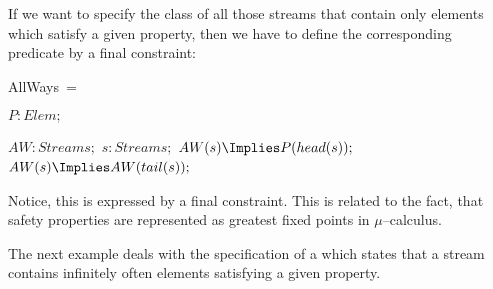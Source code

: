 \documentclass[landscape, autoslides, light]{mmiss}
\newcommand{\ns}{\normalsize}
\begin{document}
\begin{Package}[Label={FSDPT}, Title={Formal Specification of Data and Process Types}, ShortTitle={FSDPT}, Authors={Horst Reichel}, Date={February 2003}, LevelOfDetail=Lecture, Language=en-GB]
\begin{Section}[Title={Final Coalgebras as Process Types}, Label={section4}]
\begin{Section}[Title={Behavioural Subtypes}, Label={section4_4}]
\begin{Paragraph}[Title={sometimes}, Label=Paragraph130]
\end{Paragraph}
\begin{Paragraph}[Title={allways}, Label=Paragraph131]

If we want to specify the class of all those streams that contain
only elements which satisfy a given property, then we have to
define the corresponding predicate by a final constraint:

\begin{SpecDefn}{AllWays}~= 
 \item[\Then]
\I\Pred \( P : Elem; \) \item[\Cofree~\Group]
\begin{Items}
\I\Pred \( AW : Streams;\) \I\Vars \( s : Streams; \) \I\Axioms \(
AW(s) \Implies P(head(s));\)
\\ \(AW(s) \Implies AW(tail(s));\)
  ~\EndGroup \end{Items} \item[\End]
\end{SpecDefn}

\end{Paragraph}
\begin{Paragraph}[Title={allways}, Label=Paragraph132]

\ns Notice, this  is expressed by a
final constraint. This is related to the fact, that safety
properties are represented as greatest fixed points in
$\mu$--calculus.

\end{Paragraph}
\begin{Paragraph}[Title={allways sometimes}, Label=Paragraph133]

\ns The next example deals with the specification of a
 which states that a stream contains
infinitely often elements satisfying  a given property.


\end{Paragraph}
\end{Section}
\end{Section}
\end{Package}
\end{document}
